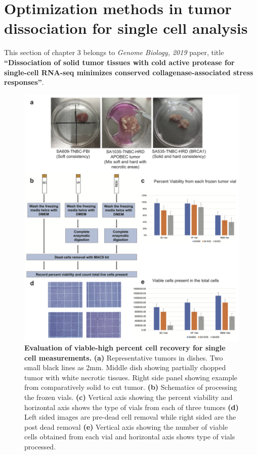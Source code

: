 \section{Optimization methods in tumor dissociation for single cell analysis}

This section of chapter 3 belongs to \textit{Genome Biology, 2019} paper, title  \textbf{``Dissociation of solid tumor tissues with cold active protease for single-cell RNA-seq minimizes conserved collagenase-associated stress responses''}.

\begin{figure}
	\centering
	\includegraphics[width=\textwidth]{Figures/chap3/cellviability2.png}
	\caption[Evaluation of viable-high percent cell recovery for single cell measurements]
	{\small
	    \textbf{Evaluation of viable-high percent cell recovery for single cell measurements.}
	    \textbf{(a)} Representative tumors in dishes. Two small black lines as 2mm. Middle dish showing partially chopped tumor with white necrotic tissues. Right side panel showing example from comparatively solid to cut tumor.
	    \textbf{(b)} Schematics of processing the frozen vials.
	    \textbf{(c)} Vertical axis showing the percent viability and horizontal axis shows the type of vials from each of three tumors  \textbf{(d)} Left sided images are pre-dead cell removal while right sided are the post dead removal \textbf{(e)} Vertical axis showing the number of viable cells obtained from each vial and horizontal axis shows type of vials processed.
	}
	\label{fig:cellviability}
\end{figure}


